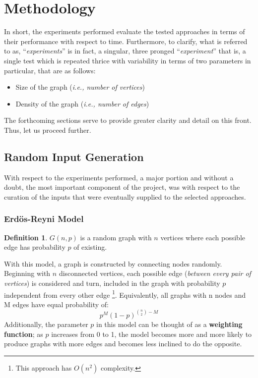 \documentclass[a4paper, 12pt]{report}
\theoremstyle{definition}
\newtheorem{definition}{Definition}
\begin{document}
\section{Methodology}
In short, the experiments performed evaluate the tested approaches in terms of their performance with respect to time. Furthermore, to clarify, what is referred to as, ``\emph{experiments}'' is in fact, a singular, three pronged ``\emph{experiment}''
that is, a single test which is repeated thrice with variability in terms of two parameters in particular, that are as follows:
\begin{itemize}
  \item Size of the graph (\emph{i.e., number of vertices})
  \item Density of the graph (\emph{i.e., number of edges})
\end{itemize}
The forthcoming sections serve to provide greater clarity and detail on this front. Thus, let us proceed further.

\subsection{Random Input Generation}
\label{sec:5.1.1}
With respect to the experiments performed, a major portion and without a doubt, the most important component of the project, was with respect to the curation of the inputs that were eventually supplied to the selected approaches. 

\subsubsection{Erd\"{o}s-Reyni Model}
\begin{definition}
\(G(n, p)\) is a random graph with \(n\) vertices where each possible edge has probability \(p\) of existing. \cite{erdoscornell:2006}
\end{definition}
With this model, a graph is constructed by connecting nodes randomly. Beginning with \(n\) disconnected vertices, each possible edge (\emph{between every pair of vertices}) is considered and turn, included in the graph with probability \(p\)
independent from every other edge\cite{erdosG4G,erdosreyni:1960,erdoscornell:2006} \footnote{This approach has \(O(n^{2})\) complexity.}. Equivalently, all graphs with n nodes and M edges have equal probability of:
\begin{equation}
p^{M}(1-p)^{\binom{n}{2} - M} 
\end{equation}
Additionally, the parameter \(p\) in this model can be thought of as a \textbf{weighting function}; as \(p\) increases from 0 to 1, the model becomes more and more likely to produce graphs with more edges and becomes less inclined to do the
opposite. 
\end{document}
